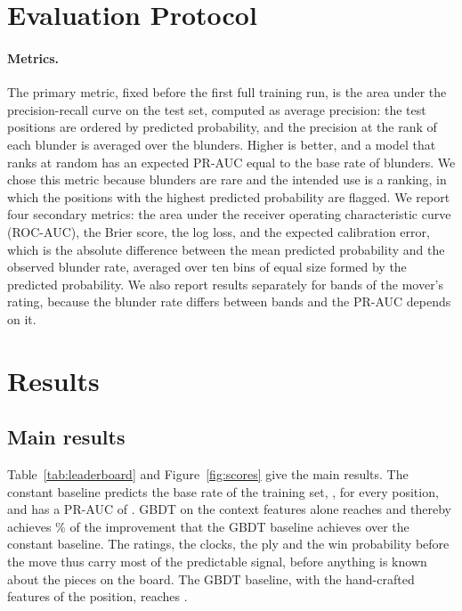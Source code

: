 \documentclass[11pt]{article}
\begin{document}


\section{Evaluation Protocol}
\label{sec:protocol}

\paragraph{Metrics.}
The primary metric, fixed before the first full training run, is the area
under the precision-recall curve on the test set, computed as average
precision: the test positions are ordered by predicted probability, and the
precision at the rank of each blunder is averaged over the blunders. Higher
is better, and a model that ranks at random has an expected PR-AUC equal to
the base rate of blunders. We chose this metric because blunders are rare and
the intended use is a ranking, in which the positions with the highest
predicted probability are flagged. We report four secondary metrics: the area
under the receiver operating characteristic curve (ROC-AUC), the Brier score,
the log loss, and the expected calibration error, which is the absolute
difference between the mean predicted probability and the observed blunder
rate, averaged over ten bins of equal size formed by the predicted
probability. We also report results separately for  bands of
the mover's rating, because the blunder rate differs between bands and the
PR-AUC depends on it.



\section{Results}
\label{sec:results}

\subsection{Main results}

Table~\ref{tab:leaderboard} and Figure~\ref{fig:scores} give the main
results. The constant baseline predicts the base rate of the training set,
, for every position, and has a PR-AUC of .
GBDT on the context features alone reaches  and
thereby achieves \% of the improvement that the GBDT
baseline achieves over the constant baseline. The ratings, the clocks, the ply and the
win probability before the move thus carry most of the predictable signal,
before anything is known about the pieces on the board. The GBDT baseline,
with the hand-crafted features of the position, reaches .
\end{document}

